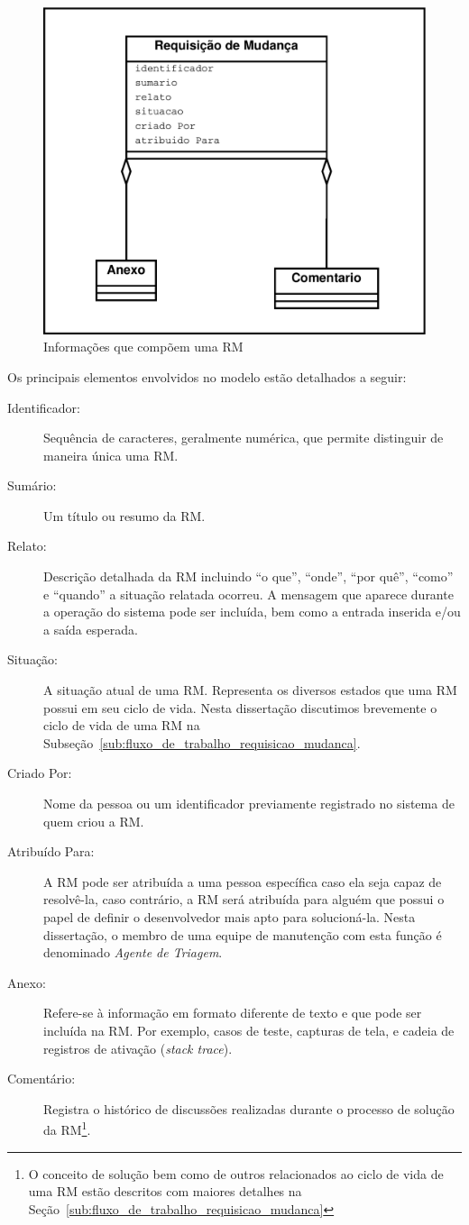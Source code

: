 \begin{figure}[htpb]
	\centering
	\includegraphics[width=0.5\linewidth]{./chapter-manutencao-software-visao-geral/img/diagrama-classe-atributos-requisicao-mudancas.pdf}
	\caption{Informações que compõem uma RM}\label{fig:diagrama-classe-atributos-requisicao-mudancas}
\end{figure}

Os principais elementos envolvidos no modelo estão detalhados a seguir:

\begin{description}
    \item [Identificador:] Sequência de caracteres, geralmente numérica,  que
        permite distinguir de maneira única uma RM\@.
	\item [Sumário:] Um título ou resumo da RM\@.
    \item [Relato:] Descrição detalhada da RM incluindo ``o que'', ``onde'',
        ``por quê'', ``como'' e ``quando'' a situação relatada ocorreu. A
        mensagem que aparece durante a operação do sistema pode ser incluída,
        bem como a entrada inserida e/ou a saída esperada.
	\item [Situação:] A situação atual de uma RM\@. Representa os diversos
		estados que uma RM possui em seu ciclo de vida. Nesta dissertação
		discutimos brevemente o ciclo de vida de uma RM na
		Subseção~\ref{sub:fluxo_de_trabalho_requisicao_mudanca}.
    \item [Criado Por:] Nome da pessoa ou um identificador previamente registrado
        no sistema de quem criou a RM\@.
    \item [Atribuído Para:] A RM pode ser atribuída a uma pessoa específica
        caso ela seja capaz de resolvê-la, caso contrário, a RM será atribuída
        para alguém que possui o papel de definir o desenvolvedor mais apto
        para solucioná-la. Nesta dissertação, o membro de uma equipe de
        manutenção com esta função é denominado \textit{Agente de Triagem}.
    \item [Anexo:] Refere-se à informação em formato diferente de texto e que
        pode ser incluída na RM\@. Por exemplo, casos de teste, capturas de
        tela, e cadeia de registros de ativação (\textit{stack trace}).
    \item [Comentário:] Registra o histórico de discussões realizadas durante o
        processo de solução da RM\@\footnote{O conceito de solução bem como de
            outros relacionados ao ciclo de vida de uma RM estão descritos com
            maiores detalhes na
            Seção~\ref{sub:fluxo_de_trabalho_requisicao_mudanca}}.
\end{description}

